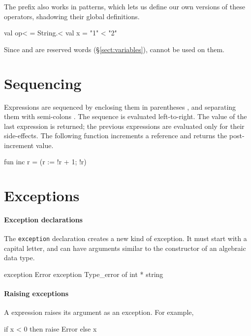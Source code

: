 \documentclass[12pt,a4paper]{book}
\begin{document}
The  prefix also works in patterns, which lets us define our own
versions of these operators, shadowing their global definitions.
\begin{smlcode}
val op< = String.<
val x = "1" < "2"
\end{smlcode}

Since  and  are reserved words
(\S\ref{sect:variables}),  cannot be used on them.

\section{Sequencing}

Expressions are sequenced by enclosing them in parentheses \smlinline{(}
\smlinline{)}, and separating them with semi-colons \smlinline{;}. The sequence
is evaluated left-to-right. The value of the last expression is returned; the
previous expressions are evaluated only for their side-effects.
The following function increments a reference and returns the post-increment value.
\begin{smlcode}
fun inc r =
  (r := !r + 1; !r)
\end{smlcode}

\section{Exceptions}
\label{sect:exceptions}

\paragraph{Exception declarations}
The \texttt{exception} declaration creates a new kind of exception. It must
start with a capital letter, and can have arguments similar to the constructor
of an algebraic data type.
\begin{smlcode}
exception Error
exception Type_error of int * string
\end{smlcode}

\paragraph{Raising exceptions}
A  expression raises its argument as an exception. For example,
\begin{smlcode}
if x < 0 then raise Error
else x
\end{smlcode}
\end{document}
